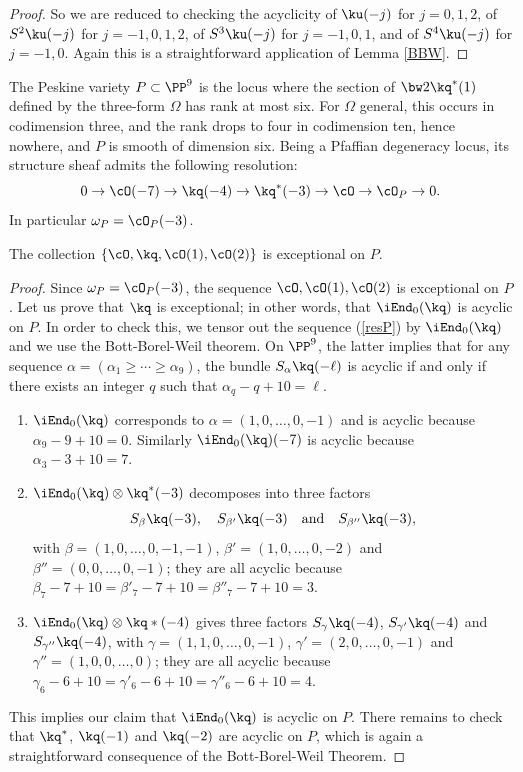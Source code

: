 \begin{proof}
So we are reduced to checking the acyclicity of $\ku(-j)$ for $j=0,1,2$, of $S^2\ku(-j)$
for $j=-1,0,1,2$, of $S^3\ku(-j)$ for $j=-1,0,1$, and of $S^4\ku(-j)$ for $j=-1,0$.
Again this is a straightforward application of Lemma \ref{BBW}.
\end{proof}

The Peskine variety $P\subset\PP^9$ is the locus where the section of $\bw2\kq^* (1)$
defined by the three-form $\Omega$ has rank at most six. For $\Omega$ general, this occurs
in codimension three, and the rank drops to four in codimension ten, hence nowhere, and
$P$ is smooth of dimension six. Being a Pfaffian degeneracy locus, its structure sheaf admits
the following resolution:\vspace*{-3pt}
\begin{equation*}\label{resP}
0\to \cO(-7)\to \kq(-4)\to \kq^* (-3)\to \cO\to\cO_P\to 0.
\end{equation*}
In particular $\omega_P=\cO_P(-3)$.

\begin{prop}\label{prop:exc-coll-on-P}
The collection $\{\cO, \kq, \cO(1), \cO(2)\}$ is exceptional on $P$.
\end{prop}

\begin{proof}
Since $\omega_P=\cO_P(-3)$, the sequence $\cO, \cO(1), \cO(2)$ is exceptional on $P$.
Let us prove that $\kq$ is exceptional; in other words, that $\iEnd_0(\kq)$ is acyclic on $P$.
In order to
check this, we tensor out the sequence (\ref{resP}) by $\iEnd_0(\kq)$ and we use
the Bott-Borel-Weil theorem. On $\PP^9$, the latter implies that for any sequence $\alpha
=(\alpha_1\ge\cdots\ge\alpha_9)$, the bundle $S_\alpha \kq (-\ell)$ is acyclic if and only if
there exists an integer $q$ such that $\alpha_{q}-q+10=\ell$.
\begin{enumerate}
\item $\iEnd_0(\kq)$ corresponds to $\alpha = (1,0,\dots,0,-1)$ and is acyclic because
$\alpha_{9}-9+10=0$. Similarly $\iEnd_0(\kq)(-7)$ is acyclic because $\alpha_3-3+10=7$.
\item $\iEnd_0(\kq)\otimes \kq^* (-3)$ decomposes into three factors\vspace*{-3pt}
\[
S_\beta \kq(-3),\quad S_{\beta'}\kq(-3)\quad\text{and}\quad S_{\beta''}\kq(-3),
\]
with $\beta = (1,0,\dots,0,-1,-1)$, $\beta' = (1,0,\dots,0,-2)$ and $\beta'' = (0,0,\dots,0,-1)$;
they are all acyclic because $\beta_7-7+10=\beta'_7-7+10=\beta''_7-7+10=3$.
\item $\iEnd_0(\kq)\otimes \kq* (-4)$ gives three factors $S_\gamma \kq(-4)$, $S_{\gamma'}\kq(-4)$
and $S_{\gamma''}\kq(-4)$,
with $\gamma = (1,1,0,\dots,0,-1)$, $\gamma' = (2,0,\dots,0,-1)$ and $\gamma'' = (1,0,0,\dots,0)$;
they are all acyclic because $\gamma_6-6+10=\gamma'_6-6+10=\gamma''_6-6+10=4$.
\end{enumerate}
This implies our claim that $\iEnd_0(\kq)$ is acyclic on $P$. There remains to check that
$\kq^*$, $\kq(-1)$ and $\kq(-2)$ are acyclic on $P$, which is again a straightforward
consequence of the Bott-Borel-Weil Theorem.
\end{proof}

